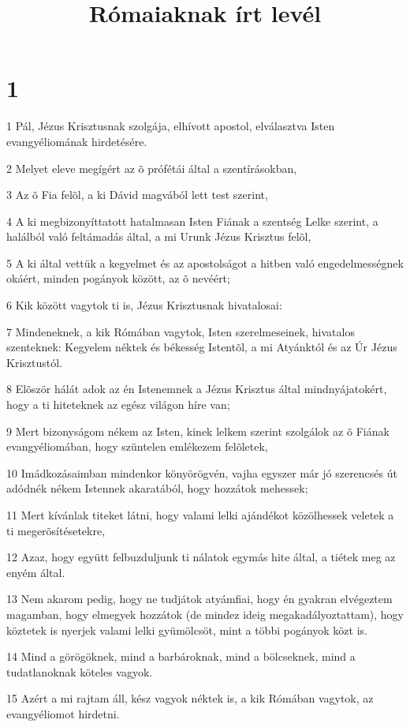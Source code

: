 

\title{Rómaiaknak írt levél}


\chapter{1}

\par 1 Pál, Jézus Krisztusnak szolgája, elhívott apostol, elválasztva Isten evangyéliomának hirdetésére.
\par 2 Melyet eleve megígért az õ prófétái által a szentírásokban,
\par 3 Az õ Fia felõl, a ki Dávid magvából lett test szerint,
\par 4 A ki megbizonyíttatott hatalmasan Isten Fiának a szentség Lelke szerint, a halálból való feltámadás által, a mi Urunk Jézus Krisztus felõl,
\par 5 A ki által vettük a kegyelmet és az apostolságot a hitben való engedelmességnek okáért, minden pogányok között, az õ nevéért;
\par 6 Kik között vagytok ti is, Jézus Krisztusnak hivatalosai:
\par 7 Mindeneknek, a kik Rómában vagytok, Isten szerelmeseinek, hivatalos szenteknek: Kegyelem néktek és békesség Istentõl, a mi Atyánktól és az Úr Jézus Krisztustól.
\par 8 Elõször hálát adok az én Istenemnek a Jézus Krisztus által mindnyájatokért, hogy a ti hiteteknek az egész világon híre van;
\par 9 Mert bizonyságom nékem az Isten, kinek lelkem szerint szolgálok az õ Fiának evangyéliomában, hogy szüntelen emlékezem felõletek,
\par 10 Imádkozásaimban mindenkor könyörögvén, vajha egyszer már jó szerencsés út adódnék nékem Istennek akaratából, hogy hozzátok mehessek;
\par 11 Mert kívánlak titeket látni, hogy valami lelki ajándékot közölhessek veletek a ti megerõsítésetekre,
\par 12 Azaz, hogy együtt felbuzduljunk ti nálatok egymás hite által, a tiétek meg az enyém által.
\par 13 Nem akarom pedig, hogy ne tudjátok atyámfiai, hogy én gyakran elvégeztem magamban, hogy elmegyek hozzátok (de mindez ideig megakadályoztattam), hogy köztetek is nyerjek valami lelki gyümölcsöt, mint a többi pogányok közt is.
\par 14 Mind a görögöknek, mind a barbároknak, mind a bölcseknek, mind a tudatlanoknak köteles vagyok.
\par 15 Azért a mi rajtam áll, kész vagyok néktek is, a kik Rómában vagytok, az evangyéliomot hirdetni.
